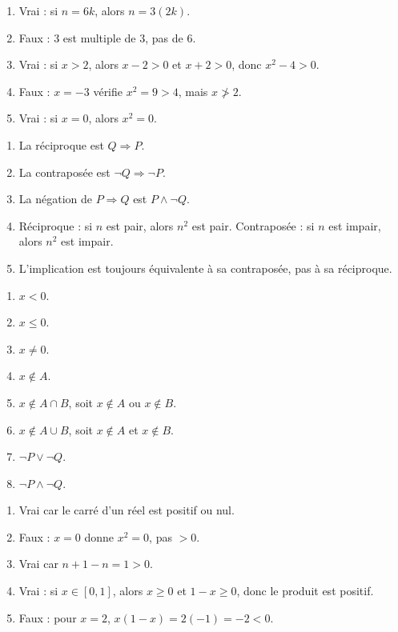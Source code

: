 \documentclass[11pt,a4paper]{article}
\newcommand{\non}{\neg}
\newcommand{\et}{\wedge}
\newcommand{\ou}{\vee}
\newcommand{\imp}{\Rightarrow}
\begin{document}
\begin{correctionbox}[APP 3]
\begin{enumerate}[label=\alph*)]
    \item Vrai : si \(n=6k\), alors \(n=3(2k)\).
    \item Faux : \(3\) est multiple de \(3\), pas de \(6\).
    \item Vrai : si \(x>2\), alors \(x-2>0\) et \(x+2>0\), donc \(x^2-4>0\).
    \item Faux : \(x=-3\) vérifie \(x^2=9>4\), mais \(x\not>2\).
    \item Vrai : si \(x=0\), alors \(x^2=0\).
\end{enumerate}
\end{correctionbox}

\begin{correctionbox}[APP 4]
\begin{enumerate}[label=\alph*)]
    \item La réciproque est \(Q\imp P\).
    \item La contraposée est \(\non Q\imp\non P\).
    \item La négation de \(P\imp Q\) est \(P\et\non Q\).
    \item Réciproque : si \(n\) est pair, alors \(n^2\) est pair. Contraposée : si \(n\) est impair, alors \(n^2\) est impair.
    \item L'implication est toujours équivalente à sa contraposée, pas à sa réciproque.
\end{enumerate}
\end{correctionbox}

\begin{correctionbox}[APP 5]
\begin{enumerate}[label=\alph*)]
    \item \(x<0\).
    \item \(x\leq0\).
    \item \(x\neq0\).
    \item \(x\notin A\).
    \item \(x\notin A\cap B\), soit \(x\notin A\) ou \(x\notin B\).
    \item \(x\notin A\cup B\), soit \(x\notin A\) et \(x\notin B\).
    \item \(\non P\ou\non Q\).
    \item \(\non P\et\non Q\).
\end{enumerate}
\end{correctionbox}

\begin{correctionbox}[APP 6]
\begin{enumerate}[label=\alph*)]
    \item Vrai car le carré d'un réel est positif ou nul.
    \item Faux : \(x=0\) donne \(x^2=0\), pas \(>0\).
    \item Vrai car \(n+1-n=1>0\).
    \item Vrai : si \(x\in[0,1]\), alors \(x\geq0\) et \(1-x\geq0\), donc le produit est positif.
    \item Faux : pour \(x=2\), \(x(1-x)=2(-1)=-2<0\).
\end{enumerate}
\end{correctionbox}
\end{document}
